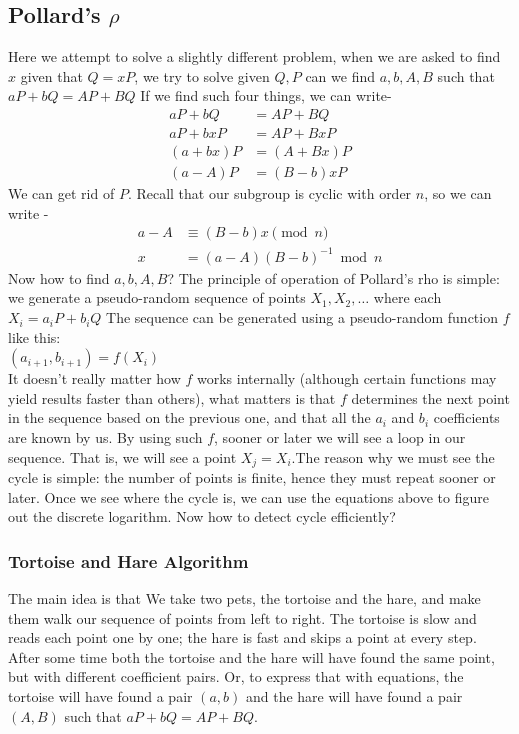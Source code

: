 \documentclass[12pt,letterpaper]{article}
\begin{document}
\subsection{Pollard's $\rho$}
Here we attempt to solve a slightly different problem, when we are asked to find $x$ given that $Q=xP$, we try to solve given $Q,P$ can we find $a,b,A,B$ such that $aP+bQ=AP+BQ$
If we find such four things, we can write- 
\begin{align*}
  aP + bQ & = AP + BQ \\
  aP + bxP & = AP + BxP \\
  (a + bx) P & = (A + Bx) P \\
  (a - A) P & = (B - b) xP
\end{align*}
We can get rid of $P$. Recall that our subgroup is cyclic with order $n$, so we can write -
\begin{align*}
  a - A & \equiv (B - b) x \pmod{n} \\
  x & = (a - A)(B - b)^{-1} \bmod{n}
\end{align*}
Now how to find $a,b,A,B$? The principle of operation of Pollard's rho is simple: we generate a pseudo-random sequence of points $X_1,X_2,\dots$ where each $X_i=a_iP+b_iQ$ The sequence can be generated using a pseudo-random function $f$ like this:\\
$(a_{i + 1}, b_{i + 1}) = f(X_i)$\\
It doesn't really matter how $f$ works internally (although certain functions may yield results faster than others), what matters is that $f$ determines the next point in the sequence based on the previous one, and that all the $a_i$ and $b_i$ coefficients are known by us.
By using such $f$, sooner or later we will see a loop in our sequence. That is, we will see a point $X_j=X_i$.The reason why we must see the cycle is simple: the number of points is finite, hence they must repeat sooner or later. Once we see where the cycle is, we can use the equations above to figure out the discrete logarithm. Now how to detect cycle efficiently?
\subsubsection{Tortoise and Hare Algorithm}
The main idea is that We take two pets, the tortoise and the hare, and make them walk our sequence of points from left to right. The tortoise is slow and reads each point one by one; the hare is fast and skips a point at every step. After some time both the tortoise and the hare will have found the same point, but with different coefficient pairs. Or, to express that with equations, the tortoise will have found a pair $(a,b)$ and the hare will have found a pair $(A,B)$ such that $aP + bQ = AP + BQ$.
\end{document}
